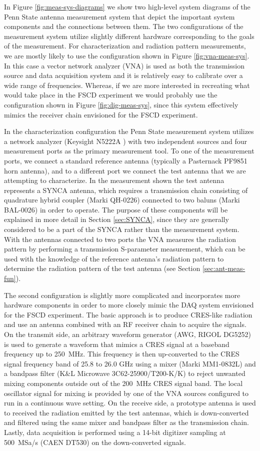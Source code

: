 In Figure \ref{fig:meas-sys-diagrams} we show two high-level system diagrams of the Penn State antenna measurement system that depict the important system components and the connections between them. The two configurations of the measurement system utilize slightly different hardware corresponding to the goals of the measurement. For characterization and radiation pattern measurements, we are mostly likely to use the configuration shown in Figure \ref{fig:vna-meas-sys}. In this case a vector network analyzer (VNA) is used as both the transmission source and data acquisition system and it is relatively easy to calibrate over a wide range of frequencies. Whereas, if we are more interested in recreating what would take place in the FSCD experiment we would probably use the configuration shown in Figure \ref{fig:dig-meas-sys}, since this system effectively mimics the receiver chain envisioned for the FSCD experiment. 

In the characterization configuration the Penn State measurement system utilizes a network analyzer (Keysight N5222A ) with two independent sources and four measurement ports as the primary measurement tool. To one of the measurement ports, we connect a standard reference antenna (typically a Pasternack PF9851 horn antenna), and to a different port we connect the test antenna that we are attempting to characterize. In the measurement shown the test antenna represents a SYNCA antenna, which requires a transmission chain consisting of quadrature hybrid coupler (Marki QH-0226) connected to two baluns (Marki BAL-0026) in order to operate. The purpose of these components will be explained in more detail in Section \ref{sec:SYNCA}, since they are generally considered to be a part of the SYNCA rather than the measurement system. With the antennas connected to two ports the VNA measures the radiation pattern by performing a transmission S-parameter measurement, which can be used with the knowledge of the reference antenna's radiation pattern to determine the radiation pattern of the test antenna (see Section \ref{sec:ant-meas-fun}).

The second configuration is slightly more complicated and incorporates more hardware components in order to more closely mimic the DAQ system envisioned for the FSCD experiment. The basic approach is to produce CRES-like radiation and use an antenna combined with an RF receiver chain to acquire the signals. On the transmit side, an arbitrary waveform generator (AWG, RIGOL DG5252) is used to generate a waveform that mimics a CRES signal at a baseband frequency up to 250~MHz. This frequency is then up-converted to the CRES signal frequency band of 25.8 to 26.0 GHz using a mixer (Marki MM1-0832L) and a bandpass filter (K\&L Microwave 3C62-25900/T200-K/K) to reject unwanted mixing components outside out of the 200~MHz CRES signal band. The local oscillator signal for mixing is provided by one of the VNA sources configured to run in a continuous wave setting. On the receive side, a prototype antenna is used to received the radiation emitted by the test antennas, which is down-converted and filtered using the same mixer and bandpass filter as the transmission chain. Lastly, data acquisition is performed using a 14-bit digitizer sampling at 500~MSa/s (CAEN DT530) on the down-converted signals.

